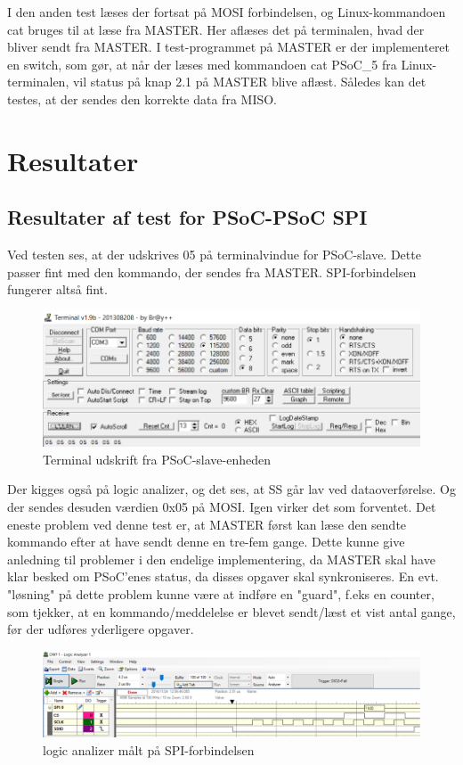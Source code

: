 I den anden test læses der fortsat på MOSI forbindelsen, og Linux-kommandoen cat bruges til at læse fra MASTER. Her aflæses det på terminalen, hvad der bliver sendt 
fra MASTER. I test-programmet på MASTER er der implementeret en switch, som gør, at når der læses med kommandoen cat PSoC{\_}5 fra Linux-terminalen, vil 
status på knap 2.1 på MASTER blive aflæst. Således kan det testes, at der sendes den korrekte data fra MISO.


\section{Resultater}
\subsection{Resultater af test for PSoC-PSoC SPI}

Ved testen ses, at der udskrives 05 på terminalvindue for PSoC-slave. Dette passer fint med den kommando, der sendes fra MASTER. SPI-forbindelsen fungerer altså
fint.
 
\begin{figure}[H]
	\centering
\includegraphics[scale=0.45]{Screenshots/Terminal_spi_slave}
\caption{Terminal udskrift fra PSoC-slave-enheden} 
\end{figure}  

Der kigges også på logic analizer, og det ses, at SS går lav ved dataoverførelse. Og der sendes desuden værdien 0x05 på MOSI. Igen virker det som forventet.
Det eneste problem ved denne test er, at MASTER først kan læse den sendte kommando efter at have sendt denne en tre-fem gange. Dette kunne give anledning til
problemer i den endelige implementering, da MASTER skal have klar besked om PSoC'enes status, da disses opgaver skal synkroniseres. En evt. "løsning" på dette
problem kunne være at indføre en "guard", f.eks en counter, som tjekker, at en kommando/meddelelse er blevet sendt/læst et vist antal gange, før der udføres
yderligere opgaver.

\begin{figure}[H]
	\centering
\includegraphics[scale=0.2]{Screenshots/Logic_analyzer}
\caption{logic analizer målt på SPI-forbindelsen} 
\end{figure} 

